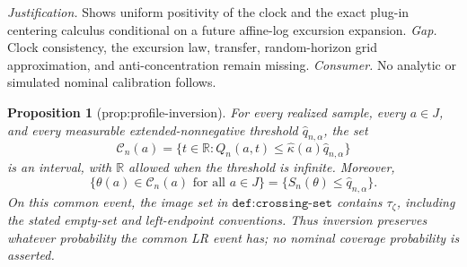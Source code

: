 \documentclass{article}
\newtheorem{proposition}{Proposition}
\begin{document}
\par\smallskip\noindent \textit{Justification.} Shows uniform positivity of the clock and the exact plug-in centering calculus conditional on a future affine-log excursion expansion. \textit{Gap.} Clock consistency, the excursion law, transfer, random-horizon grid approximation, and anti-concentration remain missing. \textit{Consumer.} No analytic or simulated nominal calibration follows.

\begin{proposition}[prop:profile-inversion]\label{prop:profile-inversion}
For every realized sample, every \(a\in J\), and every measurable extended-nonnegative threshold \(\widehat q_{n,\alpha}\), the set
\[
 \mathcal C_n(a)=\{t\in\mathbb R:Q_n(a,t)\le\widehat\kappa(a)\widehat q_{n,\alpha}\}
\]
is an interval, with \(\mathbb R\) allowed when the threshold is infinite. Moreover,
\[
 \{\theta(a)\in\mathcal C_n(a)\text{ for all }a\in J\}
 =\{S_n(\theta)\le\widehat q_{n,\alpha}\}.
\]
On this common event, the image set in \(\texttt{def:crossing-set}\) contains \(\tau_\zeta\), including the stated empty-set and left-endpoint conventions. Thus inversion preserves whatever probability the common LR event has; no nominal coverage probability is asserted.
\end{proposition}
\end{document}
